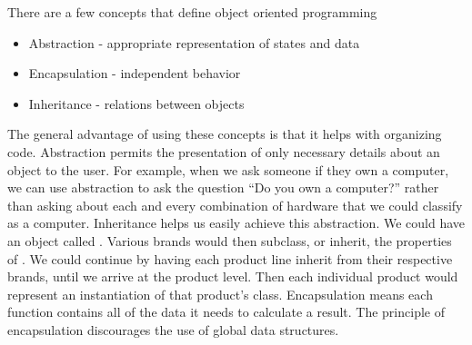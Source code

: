 There are a few concepts that define object oriented programming
\begin{itemize}
\item Abstraction - appropriate representation of states and data
\item Encapsulation - independent behavior
\item Inheritance - relations between objects
\end{itemize}
The general advantage of using these concepts is that it helps with organizing code.
Abstraction permits the presentation of only necessary details about an object to the user.
For example, when we ask someone if they own a computer, we can use abstraction to ask the question ``Do you own a computer?'' rather than asking about each and every combination of hardware that we could classify as a computer.
Inheritance helps us easily achieve this abstraction.
We could have an object called .
Various brands would then subclass, or inherit, the properties of .
We could continue by having each product line inherit from their respective brands, until we arrive at the product level.
Then each individual product would represent an instantiation of that product's class.
Encapsulation means each function contains all of the data it needs to calculate a result.
The principle of encapsulation discourages the use of global data structures.

